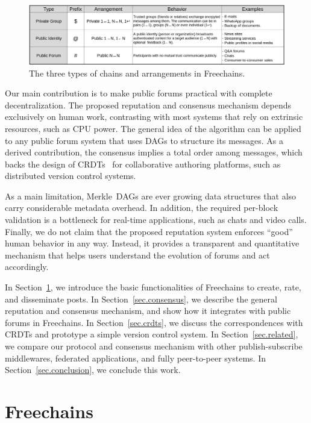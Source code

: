 \documentclass[10pt,journal,compsoc]{IEEEtran}
\newcommand{\FC}       {Freechains\xspace}
\begin{document}
\begin{figure}
\centering
\includegraphics[width=\textwidth]{arrangements.png}
\caption{The three types of chains and arrangements in \FC.}
\label{fig.table}
\end{figure}

Our main contribution is to make public forums practical with complete
decentralization.
The proposed reputation and consensus mechanism depends exclusively on human
work, contrasting with most systems that rely on extrinsic resources, such as
CPU power.
The general idea of the algorithm can be applied to any public forum system
that uses DAGs to structure its messages.
As a derived contribution, the consensus implies a total order among messages,
which backs the design of CRDTs~\cite{p2p.merkle-crdts} for collaborative
authoring platforms, such as distributed version control systems.

As a main limitation, Merkle~DAGs are ever growing data structures that also
carry considerable metadata overhead.
In addition, the required per-block validation is a bottleneck for real-time
applications, such as chats and video calls.
%
Finally, we do not claim that the proposed reputation system enforces ``good''
human behavior in any way.
Instead, it provides a transparent and quantitative mechanism that helps users
understand the evolution of forums and act accordingly.

In Section~\ref{sec.freechains}, we introduce the basic functionalities of \FC
to create, rate, and disseminate posts.
In Section~\ref{sec.consensus}, we describe the general reputation and
consensus mechanism, and show how it integrates with public forums in \FC.
In Section~\ref{sec.crdts}, we discuss the correspondences with CRDTs and
prototype a simple version control system.
In Section~\ref{sec.related}, we compare our protocol and consensus mechanism
with other publish-subscribe middlewares, federated applications, and fully
peer-to-peer systems.
In Section~\ref{sec.conclusion}, we conclude this work.

\section{Freechains}
\label{sec.freechains}
\end{document}

